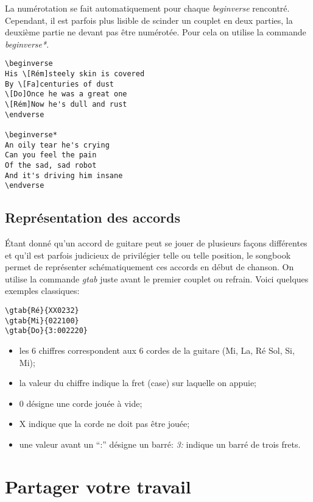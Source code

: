 \documentclass[a4paper,twoside]{article}
\begin{document}
La numérotation se fait automatiquement pour chaque \emph{beginverse}
rencontré. Cependant, il est parfois plus lisible de scinder un
couplet en deux parties, la deuxième partie ne devant pas être
numérotée. Pour cela on utilise la commande \emph{beginverse*}.
 
\begin{verbatim}
\beginverse
His \[Rém]steely skin is covered
By \[Fa]centuries of dust
\[Do]Once he was a great one
\[Rém]Now he's dull and rust
\endverse

\beginverse*
An oily tear he's crying
Can you feel the pain
Of the sad, sad robot
And it's driving him insane
\endverse
\end{verbatim}

\subsection{Représentation des accords}

Étant donné qu'un accord de guitare peut se jouer de plusieurs façons
différentes et qu'il est parfois judicieux de privilégier telle ou
telle position, le songbook permet de représenter schématiquement ces
accords en début de chanson. On utilise la commande \emph{gtab} juste
avant le premier couplet ou refrain. Voici quelques exemples classiques:

\begin{verbatim}
\gtab{Ré}{XX0232}
\gtab{Mi}{022100}
\gtab{Do}{3:002220}
\end{verbatim}

\begin{itemize}
\item les 6 chiffres correspondent aux 6 cordes de la
guitare (Mi, La, Ré Sol, Si, Mi);
\item la valeur du chiffre indique la fret (case) sur laquelle on
  appuie;
\item 0 désigne une corde jouée à vide;
\item X indique que la corde ne doit pas être jouée;
\item une valeur avant un ``:'' désigne un barré: \emph{3:} indique
un barré de trois frets.
\end{itemize}


\section{Partager votre travail}
\end{document}
